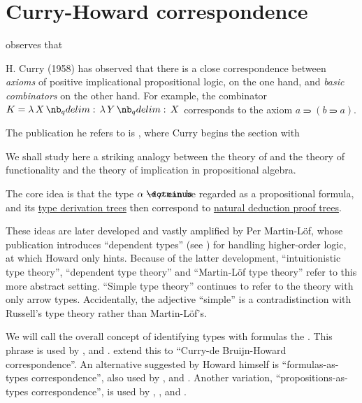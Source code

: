 \section{Curry-Howard correspondence}\label{sec:curry_howard_correspondence}

\begin{concept}\label{con:curry_howard_correspondence}
   observes that
  \begin{displayquote}
    H. Curry (1958) has observed that there is a close correspondence between \textit{axioms} of positive implicational propositional logic, on the one hand, and \textit{basic combinators} on the other hand. For example, the combinator \( K = \qabs X \qabs Y X \) corresponds to the axiom \( a \rightimply (b \rightimply a) \).
  \end{displayquote}

  The publication he refers to is \cite[312]{CurryFeys1958CombinatoryLogic}, where Curry begins the section with
  \begin{displayquote}
    We shall study here a striking analogy between the theory of and the theory of functionality and the theory of implication in propositional algebra.
  \end{displayquote}

  The core idea is that the type \( \alpha \synimplies \rho \) can be regarded as a propositional formula, and its \hyperref[def:type_derivation_tree_tree]{type derivation trees} then correspond to \hyperref[def:natural_deduction_proof_tree]{natural deduction proof trees}.

  These ideas are later developed and vastly amplified by Per Martin-L\"of, whose publication \cite{MartinLöf1975IntTypeTheory} introduces \enquote{dependent types} (see ) for handling higher-order logic, at which Howard only hints. Because of the latter development, \enquote{intuitionistic type theory}, \enquote{dependent type theory} and \enquote{Martin-L\"of type theory} refer to this more abstract setting. \enquote{Simple type theory} continues to refer to the theory with only arrow types. Accidentally, the adjective \enquote{simple} is a contradistinction with Russell's type theory rather than Martin-L\"of's.

  We will call the overall concept of identifying types with formulas the . This phrase is used by ,  and .  extend this to \enquote{Curry-de Bruijn-Howard correspondence}. An alternative suggested by Howard himself is \enquote{formulas-as-types correspondence}, also used by ,  and . Another variation, \enquote{propositions-as-types correspondence}, is used by , ,  and .


\end{concept}
